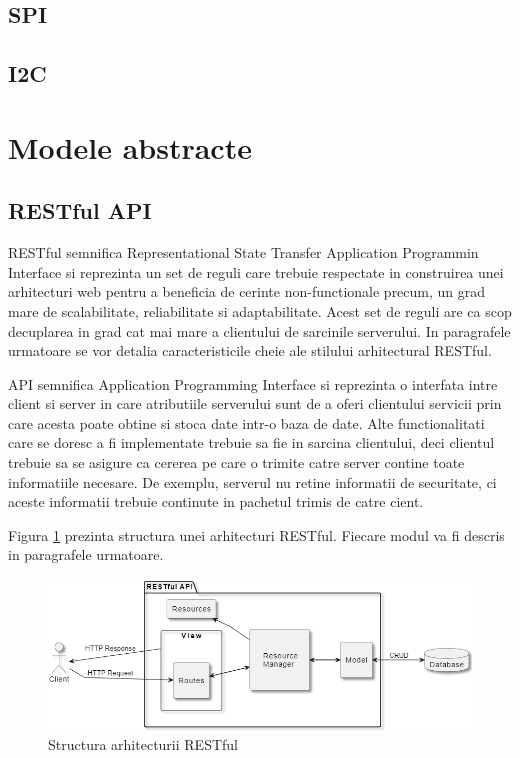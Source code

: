 \subsection{SPI}\label{sec:spi}
\subsection{I2C}\label{sec:i2c}
\section{Modele abstracte}\label{sec:modele}
\subsection{RESTful API}\label{sec:restapi}
RESTful semnifica Representational State Transfer Application Programmin Interface si reprezinta un set de reguli care trebuie respectate in construirea 
unei arhitecturi web pentru a beneficia de cerinte non-functionale precum, un grad mare de scalabilitate, reliabilitate si adaptabilitate. Acest set de 
reguli are ca scop decuplarea in grad cat mai mare a clientului de sarcinile serverului. In paragrafele urmatoare se vor detalia caracteristicile cheie 
ale stilului arhitectural RESTful.

API semnifica Application Programming Interface si reprezinta o interfata intre client si server in care atributiile serverului sunt de a oferi 
clientului servicii prin care acesta poate obtine si stoca date intr-o baza de date. Alte functionalitati care se doresc a fi implementate trebuie 
sa fie in sarcina clientului, deci clientul trebuie sa se asigure ca cererea pe care o trimite catre server contine toate informatiile necesare. 
De exemplu, serverul nu retine informatii de securitate, ci aceste informatii trebuie continute in pachetul trimis de catre cient.

Figura \ref{fig:RESTfulStructure} prezinta structura unei arhitecturi RESTful. Fiecare modul va fi descris in paragrafele urmatoare.
\begin{figure}[H]
    \centering
    \includegraphics[scale=0.7]{figs/RESTfulStructure.png}
    \caption{Structura arhitecturii RESTful}
    \label{fig:RESTfulStructure}
\end{figure}

